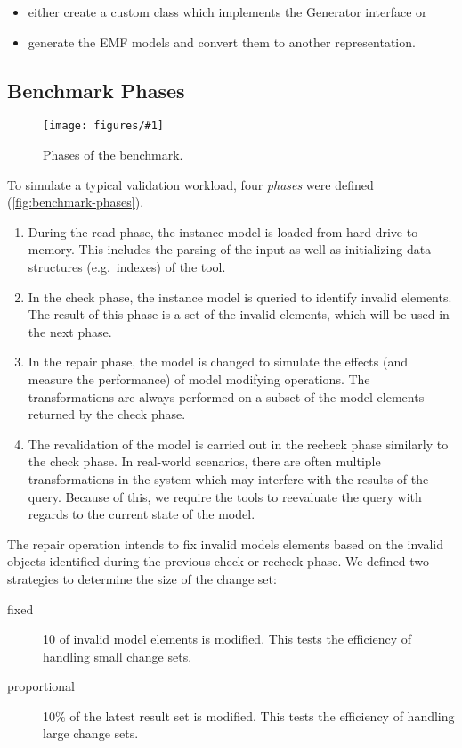 \documentclass[submission,copyright,creativecommons]{eptcs}
\newcommand{\figref}[1]{\autoref{fig:#1}}
\newcommand{\ttcfig}[2]{
\begin{figure}[htb] 
	\centering
	\texttt{[image: figures/\#1]}
	\caption{#2.}
	\label{fig:#1}
\end{figure}}
\begin{document}
\begin{itemize}
  \item either create a custom class which implements the \textsf{Generator} interface or
  \item generate the EMF models and convert them to another representation.
\end{itemize}

\subsection{Benchmark Phases}
\label{sec:phases}

\ttcfig{benchmark-phases}{Phases of the benchmark}

To simulate a typical validation workload, four \emph{phases} were defined (\figref{benchmark-phases}).

\begin{enumerate}
	\item During the \textsf{read} phase, the instance model is loaded from hard drive to memory. This includes the parsing of the input as well as initializing data structures (e.g.\ indexes) of the tool.
	\item In the \textsf{check} phase, the instance model is queried to identify invalid elements. The result of this phase is a set of the invalid elements, which will be used in the next phase.
	\item In the \textsf{repair} phase, the model is changed to simulate the effects (and measure the performance) of model modifying operations. The transformations are always performed on a subset of the model elements returned by the \textsf{check} phase.
	\item The revalidation of the model is carried out in the \textsf{recheck} phase similarly to the \textsf{check} phase. In real-world scenarios, there are often multiple transformations in the system which may interfere with the results of the query. Because of this, we require the tools to reevaluate the query with regards to the current state of the model.
\end{enumerate}

The repair operation intends to fix invalid models elements based on the invalid objects identified during the previous \textsf{check} or \textsf{recheck} phase. We defined two strategies to determine the size of the change set:

\begin{description}
\item[fixed] 10 of invalid model elements is modified. This tests the efficiency of handling small change sets.
\item[proportional] 10\% of the latest result set is modified. This tests the efficiency of handling large change sets.
\end{description}
\end{document}
